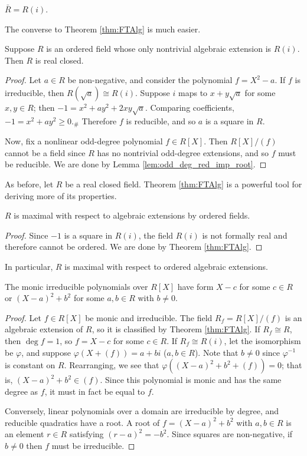 \begin{corollary}
  $\bar{R}=R(i)$.
\end{corollary}

The converse to Theorem \ref{thm:FTAlg} is much easier.

\begin{lemma}
  \label{lem:FTAlg_converse}
  Suppose $R$ is an ordered field whose only nontrivial algebraic extension is $R(i)$. Then $R$ is real closed.
\end{lemma}
\begin{proof}
  Let $a\in R$ be non-negative, and consider the polynomial $f=X^2-a$. If $f$ is irreducible, then $R(\sqrt{a})\cong R(i)$. Suppose $i$ maps to $x+y\sqrt{a}$ for some $x,y\in R$; then $-1=x^2+ay^2+2xy\sqrt{a}$. Comparing coefficients, $-1=x^2+ay^2\geq0$.$_\#$ Therefore $f$ is reducible, and so $a$ is a square in $R$.

  Now, fix a nonlinear odd-degree polynomial $f\in R[X]$. Then $R[X]/(f)$ cannot be a field since $R$ has no nontrivial odd-degree extensions, and so $f$ must be reducible. We are done by Lemma \ref{lem:odd_deg_red_imp_root}.
\end{proof}

As before, let $R$ be a real closed field. Theorem \ref{thm:FTAlg} is a powerful tool for deriving more of its properties.

\begin{lemma}
  \label{lem:RCF_max}
  $R$ is maximal with respect to algebraic extensions by ordered fields.
\end{lemma}
\begin{proof}
  Since $-1$ is a square in $R(i)$, the field $R(i)$ is not formally real and therefore cannot be ordered. We are done by Theorem \ref{thm:FTAlg}.
\end{proof}

In particular, $R$ is maximal with respect to ordered algebraic extensions.

\begin{lemma}
  \label{lem:irreds_class}
  The monic irreducible polynomials over $R[X]$ have form $X-c$ for some $c\in R$ or $(X-a)^2+b^2$ for some $a,b\in R$ with $b\neq0$.
\end{lemma}
\begin{proof}
  Let $f\in R[X]$ be monic and irreducible. The field $R_f=R[X]/(f)$ is an algebraic extension of $R$, so it is classified by Theorem \ref{thm:FTAlg}. If $R_f\cong R$, then $\deg f=1$, so $f=X-c$ for some $c\in R$. If $R_f\cong R(i)$, let the isomorphism be $\varphi$, and suppose $\varphi(X+(f))=a+bi$ ($a,b\in R$). Note that $b\neq0$ since $\varphi^{-1}$ is constant on $R$. Rearranging, we see that $\varphi((X-a)^2+b^2+(f))=0$; that is, $(X-a)^2+b^2\in(f)$. Since this polynomial is monic and has the same degree as $f$, it must in fact be equal to $f$.

  Conversely, linear polynomials over a domain are irreducible by degree, and reducible quadratics have a root. A root of $f=(X-a)^2+b^2$ with $a,b\in R$ is an element $r\in R$ satisfying $(r-a)^2=-b^2$. Since squares are non-negative, if $b\neq0$ then $f$ must be irreducible.
\end{proof}

